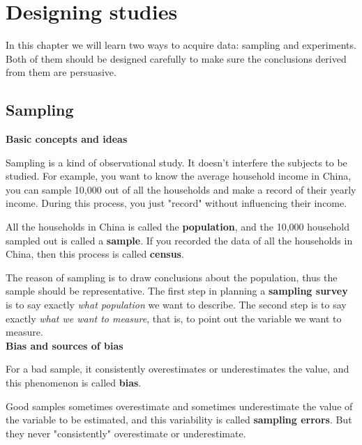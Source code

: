 \documentclass[a4paper, 12pt,twoside]{book}
\begin{document}
\pagestyle{fancy}
\fancyhf{}
\renewcommand{\chaptermark}[1]{ \markboth{#1}{} }
\fancyhead[CE,CO]{\leftmark}
\fancyfoot[LE,RO]{\thepage}

\chapter{Designing studies}

In this chapter we will learn two ways to acquire data: sampling and experiments. Both of them should be designed carefully to make sure the conclusions derived from them are persuasive.
\newpage

\section{Sampling}
 
\textbf{\large{Basic concepts and ideas}}
\vspace{0.3cm}

Sampling is a kind of observational study. It doesn't interfere the subjects to be studied. For example, you want to know the average household income in China, you can sample 10,000 out of all the households and make a record of their yearly income. During this process, you just "record" without influencing their income. 
\vspace{0.3cm}

All the households in China is called the \textbf{population}, and the 10,000 household sampled out is called a \textbf{sample}. If you recorded the data of all the households in China, then this process is called \textbf{census}.
\vspace{0.3cm}

The reason of sampling is to draw conclusions about the population, thus the sample should be representative. The first step in planning a \textbf{sampling survey} is to say exactly \textit{ what population} we want to describe. The second step is to say exactly \textit{what we want to measure}, that is, to point out the variable we want to measure.
\vspace{0.6cm}\\
\textbf{\large{Bias and sources of bias}}
\vspace{0.3cm}

For a bad sample, it consistently overestimates or underestimates the value, and this phenomenon is called \textbf{bias}.
\vspace{0.3cm}

Good samples sometimes overestimate and sometimes underestimate the value of the variable to be estimated, and this variability is called \textbf{sampling errors}. But they never "consistently" overestimate or underestimate.
\vspace{0.3cm}
\end{document}
